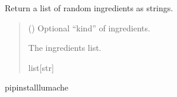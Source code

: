 \documentclass[letterpaper,11pt,english]{sphinxmanual}
\begin{document}
\begin{fulllineitems}
\label{\detokenize{usage:lumache.get_random_ingredients}}
\pysigstartsignatures
\pysiglinewithargsret
{}
{}
{}
\pysigstopsignatures
\sphinxAtStartPar
Return a list of random ingredients as strings.
\begin{quote}\begin{description}
\sphinxAtStartPar
{} (\sphinxstyleliteralemphasis{\sphinxupquote{{[}}}\sphinxstyleliteralemphasis{\sphinxupquote{{]} or }}) \textendash{} Optional “kind” of ingredients.

\sphinxAtStartPar
The ingredients list.

\sphinxAtStartPar
list{[}str{]}

\end{description}\end{quote}

\end{fulllineitems}


\begin{sphinxVerbatim}[commandchars=\\\{\}]
 pipinstalllumache
\end{sphinxVerbatim}



\renewcommand{\indexname}{Index}
\printindex
\end{document}
